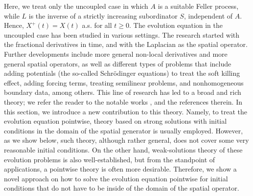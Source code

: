 \documentclass[reqno]{amsart}
\theoremstyle{remark}
\numberwithin{equation}{section} %
\newcommand{\1}{\mathds{1}}
\begin{document}
	Here, we treat only the uncoupled case in which $A$ is a suitable Feller process, while $L$ is the inverse of a strictly increasing subordinator $S$, independent of $A$. Hence, $X^+(t)=X(t)$ a.s. for all $t\ge0$. {The evolution equation in the uncoupled case has been studied in various settings. The research started with the fractional derivatives in time, and with the Laplacian as the spatial operator. Further developments include more general non-local derivatives and more general spatial operators, as well as different types of problems that include adding potentials (the so-called Schr\"odinger equations) to treat the soft killing effect, adding forcing terms, treating semilinear problems, and nonhomogeneous boundary data, among others. This line of research has led to a broad and rich theory; we refer the reader to the notable works  \cite{BaeumerLuksMeersc-SpaceTime18,DuTon_SPA,CKKW_FM18,Ton19jmaa,CDX21,KW25,CMN12,CGCV24}, and the references therein. In this section, we introduce a new contribution to this theory. Namely, to treat the evolution equation pointwise, theory based on strong solutions with initial conditions in the  domain of the spatial generator is usually employed. However, as we show below, such theory, although rather general, does not cover some very reasonable initial conditions. On the other hand, weak-solutions theory of these evolution problems is also well-established, but from the standpoint of applications, a pointwise theory is often more desirable. Therefore, we show a novel approach on how to solve the evolution equation pointwise for initial conditions that do not have to be inside of the domain of the spatial operator.}
	
\end{document}
